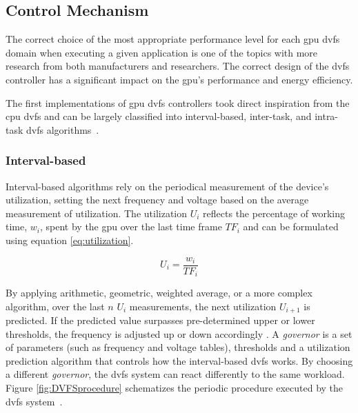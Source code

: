 \subsection{Control Mechanism}

The correct choice of the most appropriate performance level for each \acrshort{gpu} \acrshort{dvfs} domain when executing a given application is one of the topics with more research from both manufacturers and researchers. The correct design of the \acrshort{dvfs} controller has a significant impact on the \acrshort{gpu}'s performance and energy efficiency.

The first implementations of \acrshort{gpu} \acrshort{dvfs} controllers took direct inspiration from the \acrshort{cpu} \acrshort{dvfs} and can be largely classified into interval-based, inter-task, and intra-task \acrshort{dvfs} algorithms~\cite{boyer_improving_2013}. 

\subsubsection{Interval-based}

Interval-based algorithms rely on the periodical measurement of the device's utilization, setting the next frequency and voltage based on the average measurement of utilization. The utilization $U_{i}$ reflects the percentage of working time, $w_{i}$, spent by the \acrshort{gpu} over the last time frame $TF_{i}$ and can be formulated using equation \ref{eq:utilization}.

\begin{equation}
    U_i=\frac{w_i}{TF_i}
    \label{eq:utilization}
\end{equation}

By applying arithmetic, geometric, weighted average, or a more complex algorithm, over the last $n$ $U_{i}$ measurements,  the next utilization $U_{i+1}$ is predicted. If the predicted value surpasses pre-determined upper or lower thresholds, the frequency is adjusted up or down accordingly \cite{seongki_gpgpu-perf:_2015}. 
A \textit{governor} is a set of parameters (such as frequency and voltage tables), thresholds and a utilization prediction algorithm that controls how the interval-based \acrshort{dvfs} works. By choosing a different \textit{governor}, the \acrshort{dvfs} system can react differently to the same workload. Figure \ref{fig:DVFSprocedure} schematizes the periodic procedure executed by the \acrshort{dvfs} system~\cite{seongki_gpgpu-perf:_2015}. 

